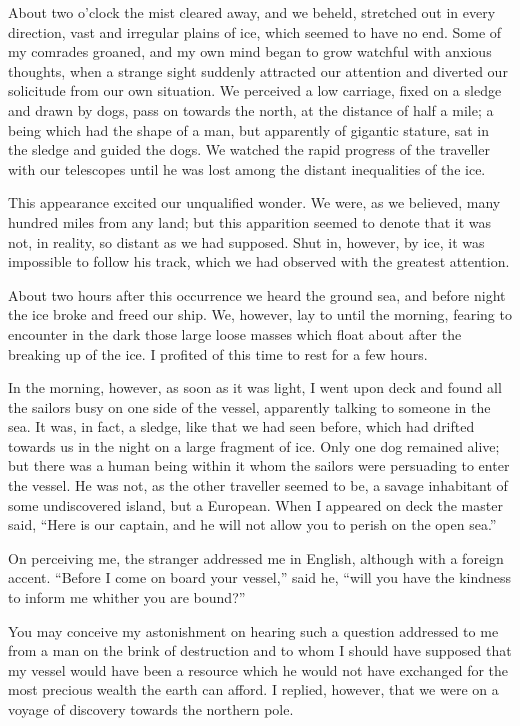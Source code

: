 \documentclass[12pt,openright]{book}
\begin{document}
About two o’clock the mist cleared away, and we beheld, stretched out in every direction, vast and irregular plains of ice, which seemed to have no end. Some of my comrades groaned, and my own mind began to grow watchful with anxious thoughts, when a strange sight suddenly attracted our attention and diverted our solicitude from our own situation. We perceived a low carriage, fixed on a sledge and drawn by dogs, pass on towards the north, at the distance of half a mile; a being which had the shape of a man, but apparently of gigantic stature, sat in the sledge and guided the dogs. We watched the rapid progress of the traveller with our telescopes until he was lost among the distant inequalities of the ice.

This appearance excited our unqualified wonder. We were, as we believed, many hundred miles from any land; but this apparition seemed to denote that it was not, in reality, so distant as we had supposed. Shut in, however, by ice, it was impossible to follow his track, which we had observed with the greatest attention.

About two hours after this occurrence we heard the ground sea, and before night the ice broke and freed our ship. We, however, lay to until the morning, fearing to encounter in the dark those large loose masses which float about after the breaking up of the ice. I profited of this time to rest for a few hours.

In the morning, however, as soon as it was light, I went upon deck and found all the sailors busy on one side of the vessel, apparently talking to someone in the sea. It was, in fact, a sledge, like that we had seen before, which had drifted towards us in the night on a large fragment of ice. Only one dog remained alive; but there was a human being within it whom the sailors were persuading to enter the vessel. He was not, as the other traveller seemed to be, a savage inhabitant of some undiscovered island, but a European. When I appeared on deck the master said, “Here is our captain, and he will not allow you to perish on the open sea.”

On perceiving me, the stranger addressed me in English, although with a foreign accent. “Before I come on board your vessel,” said he, “will you have the kindness to inform me whither you are bound?”

You may conceive my astonishment on hearing such a question addressed to me from a man on the brink of destruction and to whom I should have supposed that my vessel would have been a resource which he would not have exchanged for the most precious wealth the earth can afford. I replied, however, that we were on a voyage of discovery towards the northern pole.
\end{document}
